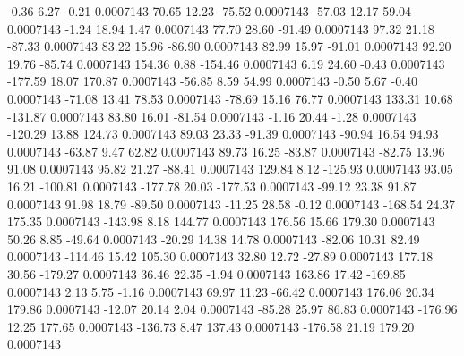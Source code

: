        -0.36        6.27       -0.21     0.0007143
       70.65       12.23      -75.52     0.0007143
      -57.03       12.17       59.04     0.0007143
       -1.24       18.94        1.47     0.0007143
       77.70       28.60      -91.49     0.0007143
       97.32       21.18      -87.33     0.0007143
       83.22       15.96      -86.90     0.0007143
       82.99       15.97      -91.01     0.0007143
       92.20       19.76      -85.74     0.0007143
      154.36        0.88     -154.46     0.0007143
        6.19       24.60       -0.43     0.0007143
     -177.59       18.07      170.87     0.0007143
      -56.85        8.59       54.99     0.0007143
       -0.50        5.67       -0.40     0.0007143
      -71.08       13.41       78.53     0.0007143
      -78.69       15.16       76.77     0.0007143
      133.31       10.68     -131.87     0.0007143
       83.80       16.01      -81.54     0.0007143
       -1.16       20.44       -1.28     0.0007143
     -120.29       13.88      124.73     0.0007143
       89.03       23.33      -91.39     0.0007143
      -90.94       16.54       94.93     0.0007143
      -63.87        9.47       62.82     0.0007143
       89.73       16.25      -83.87     0.0007143
      -82.75       13.96       91.08     0.0007143
       95.82       21.27      -88.41     0.0007143
      129.84        8.12     -125.93     0.0007143
       93.05       16.21     -100.81     0.0007143
     -177.78       20.03     -177.53     0.0007143
      -99.12       23.38       91.87     0.0007143
       91.98       18.79      -89.50     0.0007143
      -11.25       28.58       -0.12     0.0007143
     -168.54       24.37      175.35     0.0007143
     -143.98        8.18      144.77     0.0007143
      176.56       15.66      179.30     0.0007143
       50.26        8.85      -49.64     0.0007143
      -20.29       14.38       14.78     0.0007143
      -82.06       10.31       82.49     0.0007143
     -114.46       15.42      105.30     0.0007143
       32.80       12.72      -27.89     0.0007143
      177.18       30.56     -179.27     0.0007143
       36.46       22.35       -1.94     0.0007143
      163.86       17.42     -169.85     0.0007143
        2.13        5.75       -1.16     0.0007143
       69.97       11.23      -66.42     0.0007143
      176.06       20.34      179.86     0.0007143
      -12.07       20.14        2.04     0.0007143
      -85.28       25.97       86.83     0.0007143
     -176.96       12.25      177.65     0.0007143
     -136.73        8.47      137.43     0.0007143
     -176.58       21.19      179.20     0.0007143
